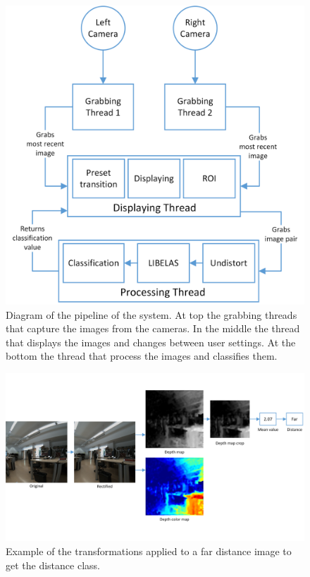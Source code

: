 \documentclass[10pt,a4paper,twocolumn,twoside]{article}
\begin{document}
	\begin{figure}
		\centering
		\includegraphics[width=1\linewidth]{img/pipeline.png}
		\caption{Diagram of the pipeline of the system. At top the grabbing threads that capture the images from the cameras. In the middle the thread that displays the images and changes between user settings. At the bottom the thread that process the images and classifies them. }
		\label{fig:pipeline}
	\end{figure}
	
	\begin{figure}
		\centering
		\includegraphics[width=1\linewidth]{img/outputFar.png}
		\caption{Example of the transformations applied to a far distance image to get the distance class.}
		\label{fig:pipelinephotos}
	\end{figure}
	
\end{document}
